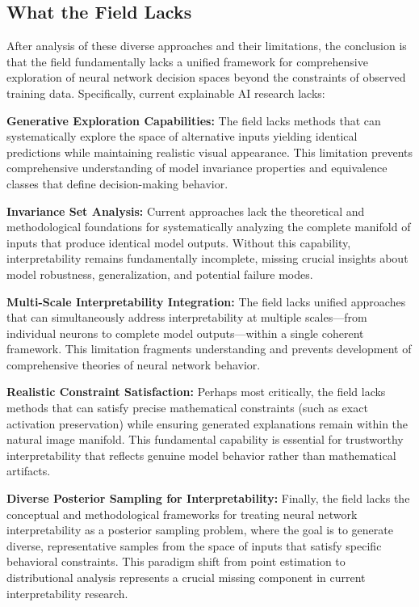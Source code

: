 \documentclass[licencjacka,en]{pracamgr}
\begin{document}
\subsection{What the Field Lacks}

After analysis of these diverse approaches and their limitations, the conclusion is that the field fundamentally lacks a unified framework for comprehensive exploration of neural network decision spaces beyond the constraints of observed training data. Specifically, current explainable AI research lacks:

\textbf{Generative Exploration Capabilities:} The field lacks methods that can systematically explore the space of alternative inputs yielding identical predictions while maintaining realistic visual appearance. This limitation prevents comprehensive understanding of model invariance properties and equivalence classes that define decision-making behavior.

\textbf{Invariance Set Analysis:} Current approaches lack the theoretical and methodological foundations for systematically analyzing the complete manifold of inputs that produce identical model outputs. Without this capability, interpretability remains fundamentally incomplete, missing crucial insights about model robustness, generalization, and potential failure modes.

\textbf{Multi-Scale Interpretability Integration:} The field lacks unified approaches that can simultaneously address interpretability at multiple scales—from individual neurons to complete model outputs—within a single coherent framework. This limitation fragments understanding and prevents development of comprehensive theories of neural network behavior.

\textbf{Realistic Constraint Satisfaction:} Perhaps most critically, the field lacks methods that can satisfy precise mathematical constraints (such as exact activation preservation) while ensuring generated explanations remain within the natural image manifold. This fundamental capability is essential for trustworthy interpretability that reflects genuine model behavior rather than mathematical artifacts.

\textbf{Diverse Posterior Sampling for Interpretability:} Finally, the field lacks the conceptual and methodological frameworks for treating neural network interpretability as a posterior sampling problem, where the goal is to generate diverse, representative samples from the space of inputs that satisfy specific behavioral constraints. This paradigm shift from point estimation to distributional analysis represents a crucial missing component in current interpretability research.
\end{document}
